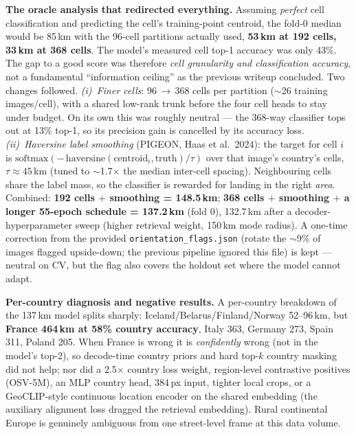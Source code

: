 \documentclass[10pt]{article}
\begin{document}
\textbf{The oracle analysis that redirected everything.} Assuming \emph{perfect} cell
classification and predicting the cell's training-point centroid, the fold-0 median would be
85\,km with the 96-cell partitions actually used, \textbf{53\,km at 192 cells, 33\,km at 368
cells}. The model's measured cell top-1 accuracy was only 43\%. The gap to a good score was
therefore \emph{cell granularity and classification accuracy}, not a fundamental
``information ceiling'' as the previous writeup concluded. Two changes followed.
\emph{(i)~Finer cells}: 96\,$\to$\,368 cells per partition ($\sim$26 training images/cell),
with a shared low-rank trunk before the four cell heads to stay under budget. On its own this
was roughly neutral --- the 368-way classifier tops out at 13\% top-1, so its precision gain
is cancelled by its accuracy loss. \emph{(ii)~Haversine label smoothing} (PIGEON, Haas et
al.\ 2024): the target for cell $i$ is $\text{softmax}(-\,\text{haversine}(\text{centroid}_i,
\text{truth})/\tau)$ over that image's country's cells, $\tau\!\approx\!45$\,km (tuned to
$\sim$1.7$\times$ the median inter-cell spacing). Neighbouring cells share the label mass, so
the classifier is rewarded for landing in the right \emph{area}. Combined:
\textbf{192 cells $+$ smoothing = 148.5\,km}; \textbf{368 cells $+$ smoothing $+$ a longer
55-epoch schedule = 137.2\,km} (fold 0), 132.7\,km after a decoder-hyperparameter sweep
(higher retrieval weight, 150\,km mode radius). A one-time correction from the provided
\texttt{orientation\_flags.json} (rotate the $\sim$9\% of images flagged upside-down; the
previous pipeline ignored this file) is kept --- neutral on CV, but the flag also covers the
holdout set where the model cannot adapt.

\textbf{Per-country diagnosis and negative results.} A per-country breakdown of the 137\,km
model splits sharply: Iceland/Belarus/Finland/Norway 52--96\,km, but \textbf{France 464\,km
at 58\% country accuracy}, Italy 363, Germany 273, Spain 311, Poland 205. When France is
wrong it is \emph{confidently} wrong (not in the model's top-2), so decode-time country
priors and hard top-$k$ country masking did not help; nor did a 2.5$\times$ country loss
weight, region-level contrastive positives (OSV-5M), an MLP country head, 384\,px input,
tighter local crops, or a GeoCLIP-style continuous location encoder on the shared embedding
(the auxiliary alignment loss dragged the retrieval embedding). Rural continental Europe is
genuinely ambiguous from one street-level frame at this data volume.
\end{document}
